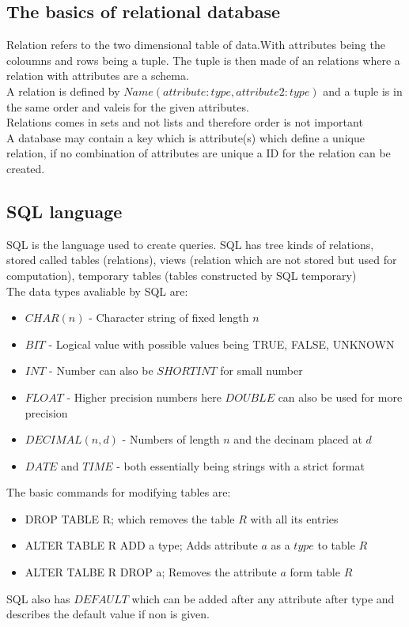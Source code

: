 \documentclass[12pt, a4paper]{article}
\begin{document}
		\subsection{The basics of relational database}
			Relation refers to the two dimensional table of data.With attributes being the coloumns and rows being a tuple. The tuple is then made of an relations where a relation with attributes are a schema. \\
			A relation is defined by $Name(attribute:type, attribute2: type)$ and a tuple is in the same order and valeis for the given attributes.\\
			Relations comes in sets and not lists and therefore order is not important\\
			A database may contain a key which is attribute(s) which define a unique relation, if no combination of attributes are unique a ID for the relation can be created.\\
		\subsection{SQL language}
			SQL is the language used to create queries. SQL has tree kinds of relations, stored called tables (relations), views (relation which are not stored but used for computation), temporary tables (tables constructed by SQL temporary)\\
			The data types avaliable by SQL are:
			\begin{itemize}
				\item $CHAR(n)$ - Character string of fixed length $n$
				\item $BIT$ - Logical value with possible values being TRUE, FALSE, UNKNOWN
				\item $INT$ - Number can also be $SHORTINT$ for small number
				\item $FLOAT$ - Higher precision numbers here $DOUBLE$ can also be used for more precision
				\item $DECIMAL(n,d)$ - Numbers of length $n$ and the decinam placed at $d$
				\item $DATE$ and $TIME$ - both essentially being strings with a strict format
			\end{itemize}
			The basic commands for modifying tables are:
			\begin{itemize}
				\item DROP TABLE R; which removes the table $R$ with all its entries
				\item ALTER TABLE R ADD a type; Adds attribute $a$ as a $type$ to table $R$
				\item ALTER TALBE R DROP a; Removes the attribute $a$ form table $R$
			\end{itemize}
			SQL also has $DEFAULT$ which can be added after any attribute after type and describes the default value if non is given.\\
\end{document}

